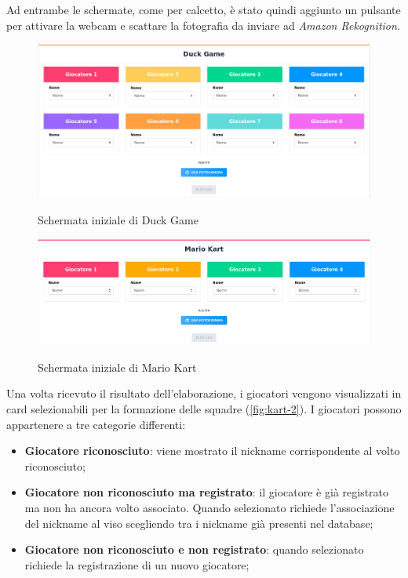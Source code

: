 		Ad entrambe le schermate, come per calcetto, è stato quindi aggiunto un pulsante per attivare la webcam e scattare la fotografia da inviare ad \emph{Amazon Rekognition}.
		
		\begin{figure}[H]
			\centering
			\includegraphics[width=\textwidth]{immagini/duck-1.png} \\
			\caption{\label{fig:duck-1} Schermata iniziale di Duck Game}
		\end{figure}
	
		\begin{figure}[H]
			\centering
			\includegraphics[width=\textwidth]{immagini/kart-1.png} \\
			\caption{\label{fig:kart-1} Schermata iniziale di Mario Kart}
		\end{figure}
		
		\noindent Una volta ricevuto il risultato dell'elaborazione, i giocatori vengono visualizzati in card selezionabili per la formazione delle squadre (\autoref{fig:kart-2}). I giocatori possono appartenere a tre categorie differenti:
		\begin{itemize}
			\item \textbf{Giocatore riconosciuto}: viene mostrato il nickname corrispondente al volto riconosciuto;
			\item \textbf{Giocatore non riconosciuto ma registrato}: il giocatore è già registrato ma non ha ancora volto associato. Quando selezionato richiede l'associazione del nickname al viso scegliendo tra i nickname già presenti nel database; 
			\item\textbf{Giocatore non riconosciuto e non registrato}: quando selezionato richiede la registrazione di un nuovo giocatore; 
		\end{itemize} 
	
